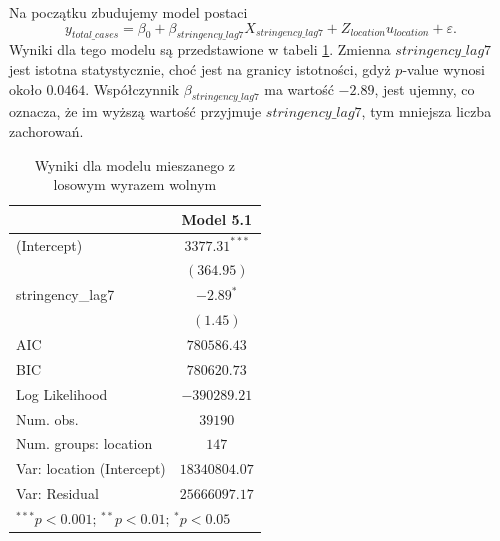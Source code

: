 \documentclass[12pt]{mwbk}
\theoremstyle{plain}
\theoremstyle{definition}
\theoremstyle{definition}
\begin{document}
Na początku zbudujemy model postaci
$$y_{total\_cases}=\beta_0+\beta_{stringency\_lag7} X_{stringency\_lag7}+Z_{location}u_{location}+\varepsilon.$$
Wyniki dla tego modelu są przedstawione w tabeli \ref{table:mod5-intercept}. Zmienna $stringency\_lag7$ jest istotna statystycznie, choć jest na granicy istotności, gdyż $p$-value wynosi około $0.0464$. Współczynnik $\beta_{stringency\_lag7}$ ma wartość $-2.89$, jest ujemny, co oznacza, że im wyższą wartość przyjmuje $stringency\_lag7$, tym mniejsza liczba zachorowań.

\newpage
\begin{table}[!h]
	\begin{center}
		\begin{tabular}{l c}
			\hline
			& Model 5.1 \\
			\hline
			(Intercept)               & $3377.31^{***}$ \\
			& $(364.95)$      \\
			stringency\_lag7          & $-2.89^{*}$     \\
			& $(1.45)$        \\
			\hline
			AIC                       & $780586.43$     \\
			BIC                       & $780620.73$     \\
			Log Likelihood            & $-390289.21$    \\
			Num. obs.                 & $39190$         \\
			Num. groups: location     & $147$           \\
			Var: location (Intercept) & $18340804.07$   \\
			Var: Residual             & $25666097.17$   \\
			\hline
			\multicolumn{2}{l}{\scriptsize{$^{***}p<0.001$; $^{**}p<0.01$; $^{*}p<0.05$}}
		\end{tabular}
		\caption{Wyniki dla modelu mieszanego z losowym wyrazem wolnym}
		\label{table:mod5-intercept}
	\end{center}
\end{table}
\end{document}
